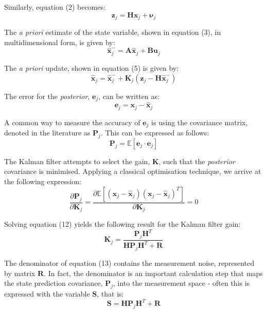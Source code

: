 \documentclass[a4paper]{article}
\begin{document}
Similarly, equation (2) becomes:
\begin{equation}
\mathbf{z}_j = \mathbf{H} \mathbf{x}_j + \boldsymbol{\nu}_j
\end{equation}

The \textit{a priori} estimate of the state variable, shown in equation (3), in multidimensional form, is given by:
\begin{equation}
\hat{\mathbf{x}}^-_j = \mathbf{A} \hat{\mathbf{x}}_j + \mathbf{B} \mathbf{u}_j
\end{equation}

The \textit{a priori} update, shown in equation (5) is given by:
\begin{equation}
\hat{\mathbf{x}}_j = \hat{\mathbf{x}}^-_j + \mathbf{K}_j (\mathbf{z}_j - \mathbf{H} \hat{\mathbf{x}}^-_j)
\end{equation}

The error for the \textit{posterior}, $\mathbf{e}_j$, can be written as:
\begin{equation}
\mathbf{e}_j = \mathbf{x}_j - \hat{\mathbf{x}}_j
\end{equation}

A common way to measure the accuracy of $\mathbf{e}_j$ is using the covariance matrix, denoted in the literature as $\mathbf{P}_j$. This can be expressed as follows:
\begin{equation}
\mathbf{P}_j = \mathbb{E}[\mathbf{e}_j \cdot \mathbf{e}_j]
\end{equation}

The Kalman filter attempts to select the gain, $\mathbf{K}$, such that the \textit{posterior} covariance is minimised. Applying a classical optimisation technique, we arrive at the following expression:
\begin{equation}
\frac{\partial \mathbf{P}_j}{\partial \mathbf{K}_j} = \frac{\partial \mathbb{E}[(\mathbf{x}_j - \hat{\mathbf{x}}_j)(\mathbf{x}_j - \hat{\mathbf{x}}_j)^T]}{\partial \mathbf{K}_j} = 0
\end{equation}

Solving equation (12) yields the following result for the Kalman filter gain:
\begin{equation}
\mathbf{K}_j = \frac{\mathbf{P}_j \mathbf{H}^T}{\mathbf{H} \mathbf{P}_j \mathbf{H}^T + \mathbf{R}}
\end{equation}

The denominator of equation (13) contains the measurement noise, represented by matrix $\mathbf{R}$. In fact, the denominator is an important calculation step that maps the state prediction covariance, $\mathbf{P}_j$, into the measurement space - often this is expressed with the variable $\mathbf{S}$, that is:
\begin{equation}
\mathbf{S} = \mathbf{H} \mathbf{P}_j \mathbf{H}^T + \mathbf{R} 
\end{equation}
\end{document}
